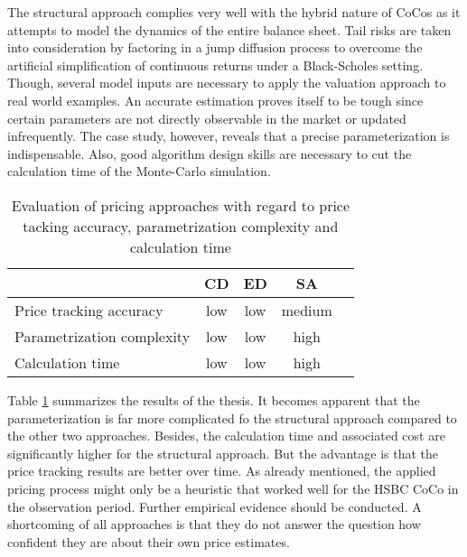 The structural approach complies very well with the hybrid nature of CoCos as it attempts to model the dynamics of the entire balance sheet. Tail risks are taken into consideration by factoring in a jump diffusion process to overcome the artificial simplification of continuous returns under a Black-Scholes setting. Though, several model inputs are necessary to apply the valuation approach to real world examples. An accurate estimation proves itself to be tough since certain parameters are not directly observable in the market or updated infrequently. The case study, however, reveals that a precise parameterization is indispensable. Also, good algorithm design skills are necessary to cut the calculation time of the Monte-Carlo simulation.

\begin{table}[H]
	\setlength{\extrarowheight}{2.5pt}
	\centering
	\begin{tabular}{lcccc}
		\toprule
			 & \textbf{CD} & \textbf{ED} & \textbf{SA}\\
		\midrule
			Price tracking accuracy & \cellcolor{red!20} low & \cellcolor{red!20} low & \cellcolor{yellow!20} medium\\
			Parametrization complexity & \cellcolor{green!20} low & \cellcolor{green!20} low & \cellcolor{red!20} high\\
			Calculation time & \cellcolor{green!20} low & \cellcolor{green!20} low & \cellcolor{red!20} high\\
		\bottomrule
	\end{tabular}
	\caption[Evaluation of pricing approaches with regard to three dimensions]{Evaluation of pricing approaches with regard to price tacking accuracy, parametrization complexity and calculation time}
	\label{table:evaluationtrigger}
\end{table}

Table \ref{table:evaluationtrigger} summarizes the results of the thesis. It becomes apparent that the parameterization is far more complicated fo the structural approach compared to the other two approaches. Besides, the calculation time and associated cost are significantly higher for the structural approach. But the advantage is that the price tracking results are better over time. As already mentioned, the applied pricing process might only be a heuristic that worked well for the HSBC CoCo in the observation period. Further empirical evidence should be conducted. A shortcoming of all approaches is that they do not answer the question how confident they are about their own price estimates. 








